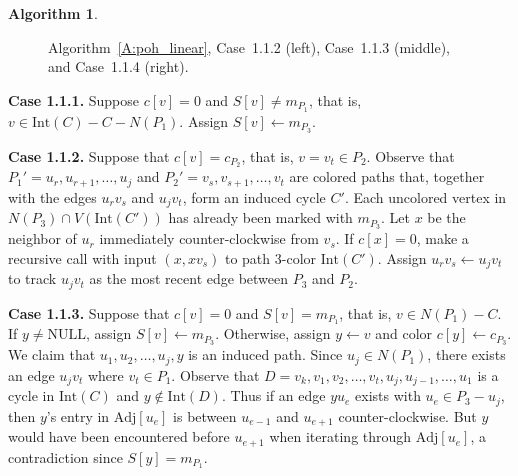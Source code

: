 \documentclass[12pt,letterpaper]{article}
\theoremstyle{plain}
\theoremstyle{definition}
\theoremstyle{break}
\newtheorem{algorithm}[lemma]{Algorithm}     %
\begin{document}
\begin{algorithm}
\begin{figure}[ht]
\begin{center}
\caption{Algorithm~\ref{A:poh_linear}, Case~1.1.2 (left), Case~1.1.3 (middle),
and Case~1.1.4 (right).}\label{F:poh_linear_1}
\end{center}
\end{figure}

\textbf{Case 1.1.1.} Suppose $c[v]=0$ and $S[v]\ne m_{P_1}$, that is,
$v\in\text{Int}(C)-C-N(P_1)$. Assign $S[v]\leftarrow m_{P_3}$.

\textbf{Case 1.1.2.} Suppose that $c[v]=c_{P_2}$, that is, $v=v_t\in P_2$.
Observe that $P_1'=u_r,u_{r+1},\ldots, u_j$ and $P_2'=v_s,v_{s+1},\ldots,v_t$
are colored paths that, together with the edges $u_rv_s$ and $u_jv_t$,
form an induced cycle $C'$. Each uncolored vertex in
$N(P_3)\cap V(\text{Int}(C'))$ has already been marked with $m_{P_3}$.
Let
$x$ be the neighbor of $u_r$ immediately counter-clockwise from $v_s$.
If $c[x]=0$, make a recursive call with input $(x, xv_s)$
to path $3$-color $\text{Int}(C')$. Assign
$u_rv_s\leftarrow u_jv_t$ to track $u_jv_t$ as the most recent edge between
$P_3$ and $P_2$.

\textbf{Case 1.1.3.} Suppose that $c[v]=0$ and $S[v]=m_{P_1}$, that is,
$v\in N(P_1)-C$. If $y\ne\text{NULL}$, assign $S[v]\leftarrow m_{P_3}$.
Otherwise, assign $y\leftarrow v$ and color
$c[y]\leftarrow c_{P_3}$. We claim that $u_1,u_2,\ldots,u_j,y$ is an induced
path. Since $u_j\in N(P_1)$, there exists an edge $u_jv_t$ where $v_t\in P_1$.
Observe that $D=v_k,v_1,v_2,\ldots,v_t,u_j,u_{j-1},\ldots,u_1$ is a cycle in
$\text{Int}(C)$ and $y\not\in\text{Int}(D)$. Thus if an edge $yu_e$ exists with
$u_e\in P_3-u_j$,
then $y$'s entry in $\text{Adj}[u_e]$ is between $u_{e-1}$ and
$u_{e+1}$ counter-clockwise.
But $y$ would have been encountered before $u_{e+1}$
when iterating through $\text{Adj}[u_e]$, a contradiction since
$S[y]=m_{P_1}$.


\end{algorithm}
\end{document}
